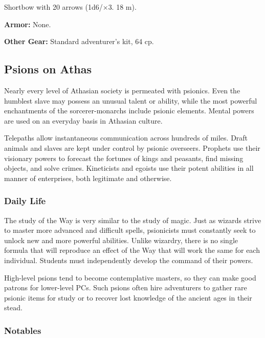 Shortbow with 20 arrows (1d6/$\times$3. 18 m).

\textbf{Armor:} None.

\textbf{Other Gear:} Standard adventurer's kit, 64 cp.

\subsection{Psions on Athas}

Nearly every level of Athasian society is permeated with psionics. Even the humblest slave may possess an unusual talent or ability, while the most powerful enchantments of the sorcerer-monarchs include psionic elements. Mental powers are used on an everyday basis in Athasian culture.

Telepaths allow instantaneous communication across hundreds of miles. Draft animals and slaves are kept under control by psionic overseers. Prophets use their visionary powers to forecast the fortunes of kings and peasants, find missing objects, and solve crimes. Kineticists and egoists use their potent abilities in all manner of enterprises, both legitimate and otherwise.

\subsubsection{Daily Life}

The study of the Way is very similar to the study of magic. Just as wizards strive to master more advanced and difficult spells, psionicists must constantly seek to unlock new and more powerful abilities. Unlike wizardry, there is no single formula that will reproduce an effect of the Way that will work the same for each individual. Students must independently develop the command of their powers.

High-level psions tend to become contemplative masters, so they can make good patrons for lower-level PCs. Such psions often hire adventurers to gather rare psionic items for study or to recover lost knowledge of the ancient ages in their stead.

\subsubsection{Notables}


